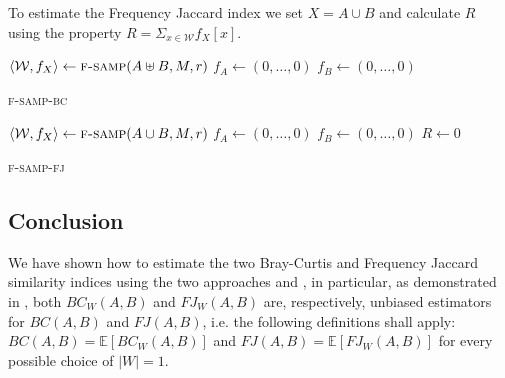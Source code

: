 To estimate the Frequency Jaccard index we set $X = A \cup B$ and calculate $R$ using the property $R = \Sigma_{x \in \mathcal{W}}{f_X[x]}$.

\clearpage

\begin{algorithm}[h]
	\small
	\DontPrintSemicolon
	$\langle \mathcal{W}, f_X \rangle \gets \textsc{f-samp}(A \uplus B, M, r)$ \;
	$f_A \gets (0,\ldots,0)$\;
	$f_B \gets (0,\ldots,0)$\;
	\caption{\textsc{f-samp-bc}}
	\label{alg:f-samp-bc}
\end{algorithm}

\begin{algorithm}[h]
	\small
	\DontPrintSemicolon
	$\langle \mathcal{W}, f_X \rangle \gets \textsc{f-samp}(A \cup B, M, r)$ \;
	$f_A \gets (0,\ldots,0)$\;
	$f_B \gets (0,\ldots,0)$\;
	$R \gets 0$\;
	\caption{\textsc{f-samp-fj}}
	\label{alg:f-samp-fj}
\end{algorithm}

\subsection*{Conclusion}
We have shown how to estimate the two Bray-Curtis and Frequency Jaccard similarity indices using the two approaches \fcount and \fsamp, in particular, as demonstrated in \cite{SubSim}, both $BC_{W}(A,B)$ and $FJ_{W}(A,B)$ are, respectively, unbiased estimators for $BC(A,B)$ and $FJ(A,B)$, i.e. the following definitions shall apply: $BC(A,B) = \mathbb{E}[BC_{W}(A,B)]$ and $FJ(A,B) = \mathbb{E}[FJ_{W}(A,B)]$ for every possible choice of $|W| = 1$.

